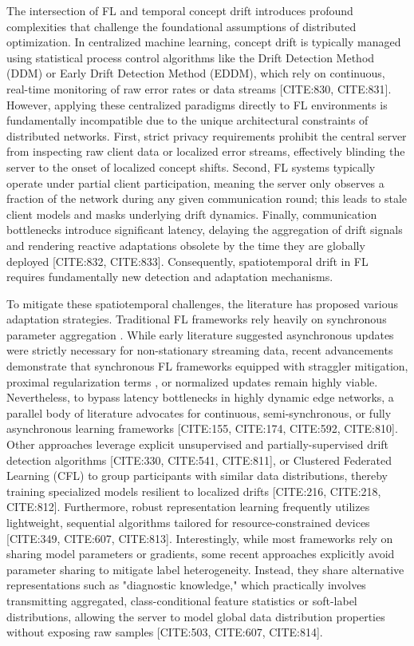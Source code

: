 \documentclass[journal]{IEEEtran}
\begin{document}
The intersection of FL and temporal concept drift introduces profound complexities that challenge the foundational assumptions of distributed optimization. In centralized machine learning, concept drift is typically managed using statistical process control algorithms like the Drift Detection Method (DDM) or Early Drift Detection Method (EDDM), which rely on continuous, real-time monitoring of raw error rates or data streams [CITE:830, CITE:831]. However, applying these centralized paradigms directly to FL environments is fundamentally incompatible due to the unique architectural constraints of distributed networks. First, strict privacy requirements prohibit the central server from inspecting raw client data or localized error streams, effectively blinding the server to the onset of localized concept shifts. Second, FL systems typically operate under partial client participation, meaning the server only observes a fraction of the network during any given communication round; this leads to stale client models and masks underlying drift dynamics. Finally, communication bottlenecks introduce significant latency, delaying the aggregation of drift signals and rendering reactive adaptations obsolete by the time they are globally deployed [CITE:832, CITE:833]. Consequently, spatiotemporal drift in FL requires fundamentally new detection and adaptation mechanisms.

To mitigate these spatiotemporal challenges, the literature has proposed various adaptation strategies. Traditional FL frameworks rely heavily on synchronous parameter aggregation \cite{Li2019}. While early literature suggested asynchronous updates were strictly necessary for non-stationary streaming data, recent advancements demonstrate that synchronous FL frameworks equipped with straggler mitigation, proximal regularization terms \cite{paper826}, or normalized updates \cite{paper827} remain highly viable. Nevertheless, to bypass latency bottlenecks in highly dynamic edge networks, a parallel body of literature advocates for continuous, semi-synchronous, or fully asynchronous learning frameworks [CITE:155, CITE:174, CITE:592, CITE:810]. Other approaches leverage explicit unsupervised and partially-supervised drift detection algorithms [CITE:330, CITE:541, CITE:811], or Clustered Federated Learning (CFL) to group participants with similar data distributions, thereby training specialized models resilient to localized drifts [CITE:216, CITE:218, CITE:812]. Furthermore, robust representation learning frequently utilizes lightweight, sequential algorithms tailored for resource-constrained devices [CITE:349, CITE:607, CITE:813]. Interestingly, while most frameworks rely on sharing model parameters or gradients, some recent approaches explicitly avoid parameter sharing to mitigate label heterogeneity. Instead, they share alternative representations such as "diagnostic knowledge," which practically involves transmitting aggregated, class-conditional feature statistics or soft-label distributions, allowing the server to model global data distribution properties without exposing raw samples [CITE:503, CITE:607, CITE:814].
\end{document}
